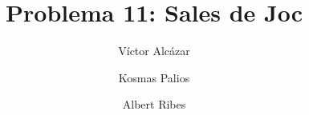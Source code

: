 
\usepackage[utf8]{inputenc}
\usepackage{enumitem}
\usepackage[catalan]{babel}

\title{Problema 11: Sales de Joc}
\author{
Víctor Alcázar
\and
Kosmas Palios
\and
Albert Ribes
}

\maketitle




